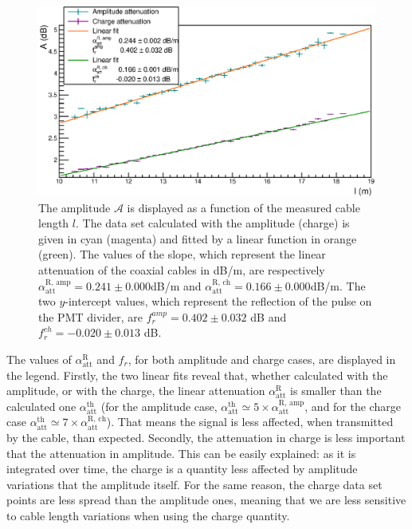 \begin{figure}[h]
  \centering
  \includegraphics[width=15cm]{commissioning/fig_commissioning/attenuation_length.eps}
  \caption{The amplitude $\mathcal{A}$ is displayed as a function of the measured cable length $l$.
    The data set calculated with the amplitude (charge) is given in cyan (magenta) and fitted by a linear function in orange (green).
    The values of the slope, which represent the linear attenuation of the coaxial cables in dB/m, are respectively $\alpha_{\text{att}}^{\text{R, amp}} = 0.241\pm 0.000$dB/m and $\alpha_{\text{att}}^{\text{R, ch}} = 0.166\pm0.000$dB/m.
    The two $y$-intercept values, which represent the reflection of the pulse on the PMT divider, are $f_{r}^{amp} = 0.402\pm 0.032$ dB and $f_{r}^{ch} = -0.020\pm 0.013$ dB.
    \label{fig:attenuation}}
\end{figure}
The values of $\alpha_{\text{att}}^{\text{R}}$ and $f_{r}$, for both amplitude and charge cases, are displayed in the legend.
Firstly, the two linear fits reveal that, whether calculated with the amplitude, or with the charge, the linear attenuation $\alpha_{\text{att}}^{\text{R}}$ is smaller than the calculated one $\alpha_{\text{att}}^{\text{th}}$ (for the amplitude case, $\alpha_{\text{att}}^{\text{th}}\simeq 5\times \alpha_{\text{att}}^{\text{R, amp}}$, and for the charge case $\alpha_{\text{att}}^{\text{th}}\simeq 7\times \alpha_{\text{att}}^{\text{R, ch}}$).
That means the signal is less affected, when transmitted by the cable, than expected.
Secondly, the attenuation in charge is less important that the attenuation in amplitude.
This can be easily explained: as it is integrated over time, the charge is a quantity less affected by amplitude variations that the amplitude itself.
For the same reason, the charge data set points are less spread than the amplitude ones, meaning that we are less sensitive to cable length variations when using the charge quantity.


